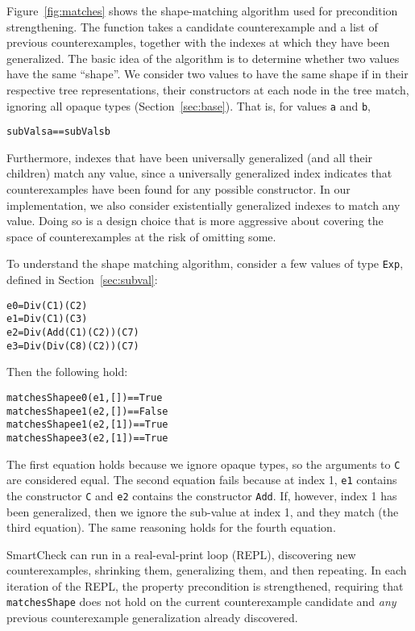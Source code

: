 \documentclass{sigplanconf}
\newenvironment{code}{\begin{alltt}\footnotesize}{\end{alltt}}
\newcommand{\ttp}[1]{\texttt{#1}}
\begin{document}
Figure~\ref{fig:matches} shows the shape-matching algorithm used for precondition
strengthening.  The function takes a candidate counterexample and a list of
previous counterexamples, together with the indexes at which they have been
generalized.  The basic idea of the algorithm is to determine whether two values
have the same ``shape''.  We consider two values to have the same
shape if in their respective tree representations, their constructors at each
node in the tree match, ignoring all opaque types (Section~\ref{sec:base}).
That is, for values \ttp{a} and \ttp{b},
%
\begin{code}
subVals a == subVals b
\end{code}
%
\noindent
Furthermore, indexes that have been universally generalized (and all their
children) match any value, since a universally generalized index indicates that
counterexamples have been found for any possible constructor.  In our
implementation, we also consider existentially generalized indexes to match any
value.  Doing so is a design choice that is more aggressive about covering the
space of counterexamples at the risk of omitting some.

To understand the shape matching algorithm, consider a few values of type
\ttp{Exp}, defined in Section~\ref{sec:subval}:
%
\begin{code}
e0 = Div (C 1) (C 2)
e1 = Div (C 1) (C 3)
e2 = Div (Add (C 1) (C 2)) (C 7)
e3 = Div (Div (C 8) (C 2)) (C 7)
\end{code}
%
\noindent
Then the following hold:
%
\begin{code}
matchesShape e0 (e1, [])  == True
matchesShape e1 (e2, [])  == False
matchesShape e1 (e2, [1]) == True
matchesShape e3 (e2, [1]) == True
\end{code}
%
The first equation holds because we ignore opaque types, so the arguments to
\ttp{C} are considered equal.  The second equation fails because at index 1,
\ttp{e1} contains the constructor \ttp{C} and \ttp{e2} contains the constructor
\ttp{Add}.  If, however, index 1 has been generalized, then we ignore the sub-value
at index 1, and they match (the third equation).  The same reasoning holds for
the fourth equation.

SmartCheck can run in a real-eval-print loop (REPL), discovering new
counterexamples, shrinking them, generalizing them, and then repeating.  In each
iteration of the REPL, the property precondition is strengthened, requiring that
\ttp{matchesShape} does not hold on the current counterexample candidate and
\emph{any} previous counterexample generalization already discovered.
\end{document}

